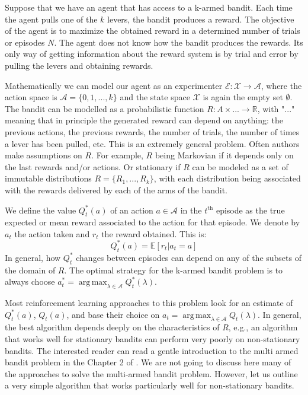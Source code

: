 \documentclass[11pt,a4paper,twoside]{report}
\DeclareMathOperator*{\argmax}{arg\,max}
\newcommand{\+}{\textnormal{+} }
\theoremstyle{definition}
\numberwithin{equation}{chapter}
\begin{document}
Suppose that we have an agent that has access to a k-armed bandit. Each time the
agent pulls one of the $k$ levers, the bandit produces a reward. The objective
of the agent is to maximize the obtained reward in a determined number of trials
or episodes $N$. The agent does not know how the bandit produces the rewards. Its
only way of getting information about the reward system is by trial and error by
pulling the levers and obtaining rewards.

Mathematically we can model our agent as an experimenter
$\mathscr{E}:\mathcal{X}\rightarrow\mathcal{A}$, where the action space is
$\mathcal{A}=\{0,1,...,k\}$ and the state space $\mathcal{X}$ is again the empty
set $\emptyset$. The bandit can be modelled as a probabilistic function
$R:A\times ... \rightarrow \mathbb{R}$, with "$...$" meaning that in principle
the generated reward can depend on anything: the previous actions, the previous
rewards, the number of trials, the number of times a lever has been pulled, etc.
This is an extremely general problem. Often authors make assumptions on $R$. For
example, $R$ being Markovian if it depends only on the last rewards and/or actions.
Or stationary if $R$ can be modeled as a set of immutable distributions
$R=\{R_1,... , R_k\}$, with each distribution being associated with the rewards
delivered by each of the arms of the bandit.

We define the value $Q_t^*(a)$ of an action $a \in \mathcal{A}$ in the
$t^\text{th}$ episode as the true expected or mean reward associated to the
action for that episode. We denote by $a_t$ the action taken and $r_t$ the reward
obtained. This is:
\begin{equation}
  Q_t^*(a) = \mathbb{E}[r_t|a_t = a]
\end{equation}
In general, how $Q_t^*$ changes between episodes can depend on any of the subsets
of the domain of $R$. The optimal strategy for the k-armed bandit problem is to
always choose $a_t^*=\argmax_{\lambda \in \mathcal{A}} Q_t^*(\lambda)$.

Most reinforcement learning approaches to this problem look for an estimate of
$Q_t^*(a)$, $Q_t(a)$, and base their choice on $a_t= \argmax_{\lambda \in
\mathcal{A}} Q_t(\lambda)$. In general, the best algorithm depends deeply on the
characteristics of $R$, e.g., an algorithm that works well for stationary
bandits can perform very poorly on non-stationary bandits. The interested reader
can read a gentle introduction to the multi armed bandit problem in the Chapter
2 of \cite{sutton2018reinforcement}. We are not going to discuss here many of
the approaches to solve the multi-armed bandit problem. However, let us outline
a very simple algorithm that works particularly well for non-stationary bandits.
\end{document}
